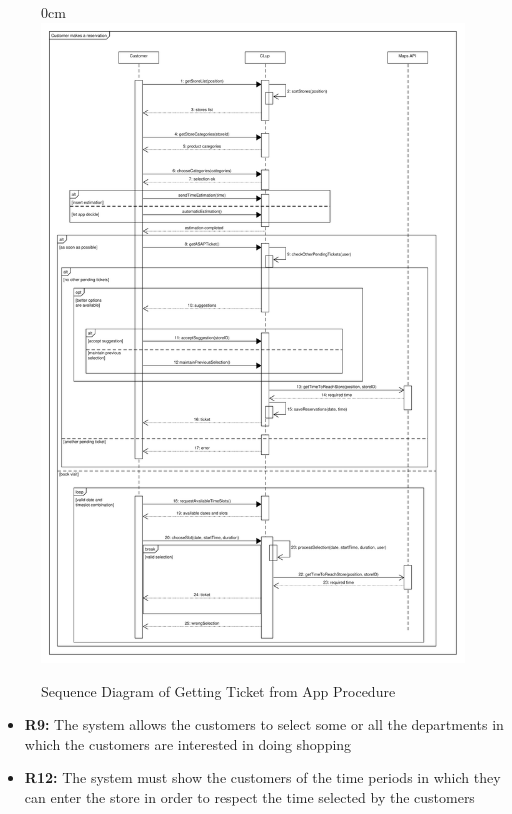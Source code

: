 \documentclass{article}
\begin{document}
\begin{center}
							\begin{figure}
								\begin{adjustwidth} {0cm}{}
									\centering
									\includegraphics[scale=0.343]{SD/5_makeReservation.pdf}\\
									\caption{Sequence Diagram of Getting Ticket from App Procedure}
								\end{adjustwidth}
							\end{figure}

\begin{itemize}
					\bigskip
					\bigskip
					\bigskip
					 {\bfseries Required functional requirements: }


					\item {\bfseries R9: } The system allows the customers to select some or all the departments in
which the customers are interested in doing shopping
					\item {\bfseries R12: } The system must show the customers of the time periods in which they can
enter the store in order to respect the time selected by the customers



\end{itemize}
\end{center}
\end{document}
